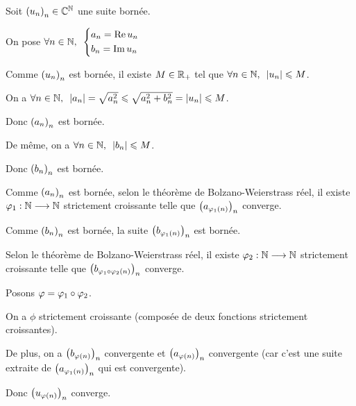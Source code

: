 \begin{dem}
Soit \(\left(u_n\right)_n\in\mathbb{C}^{\mathbb{N}}\) une suite bornée.

On pose \(\quantifs{\forall n\in\N}\begin{dcases}a_n=\Re u_n \\ b_n=\Im u_n\end{dcases}\)

Comme \(\left(u_n\right)_n\) est bornée, il existe \(M\in\mathbb{R}_+\) tel que \(\quantifs{\forall n\in\N}\abs{u_n}\leq M\).

On a \(\quantifs{\forall n\in\N}\abs{a_n}=\sqrt{a_n^2}\leq\sqrt{a_n^2+b_n^2}=\abs{u_n}\leq M\).

Donc \(\left(a_n\right)_n\) est bornée.

De même, on a \(\quantifs{\forall n\in\N}\abs{b_n}\leq M\).

Donc \(\left(b_n\right)_n\) est bornée.

Comme \(\left(a_n\right)_n\) est bornée, selon le théorème de Bolzano-Weierstrass réel, il existe \(\varphi_1:\mathbb{N}\longrightarrow\mathbb{N}\) strictement croissante telle que \(\left(a_{\varphi_1\left(n\right)}\right)_n\) converge.

Comme \(\left(b_n\right)_n\) est bornée, la suite \(\left(b_{\varphi_1\left(n\right)}\right)_n\) est bornée.

Selon le théorème de Bolzano-Weierstrass réel, il existe \(\varphi_2:\mathbb{N}\longrightarrow\mathbb{N}\) strictement croissante telle que \(\left(b_{\varphi_1\circ\varphi_2\left(n\right)}\right)_n\) converge.

Posons \(\varphi=\varphi_1\circ\varphi_2\).

On a \(\phi\) strictement croissante (composée de deux fonctions strictement croissantes).

De plus, on a \(\left(b_{\varphi\left(n\right)}\right)_n\) convergente et \(\left(a_{\varphi\left(n\right)}\right)_n\) convergente (car c'est une suite extraite de \(\left(a_{\varphi_1\left(n\right)}\right)_n\) qui est convergente).

Donc \(\left(u_{\varphi\left(n\right)}\right)_n\) converge.
\end{dem}